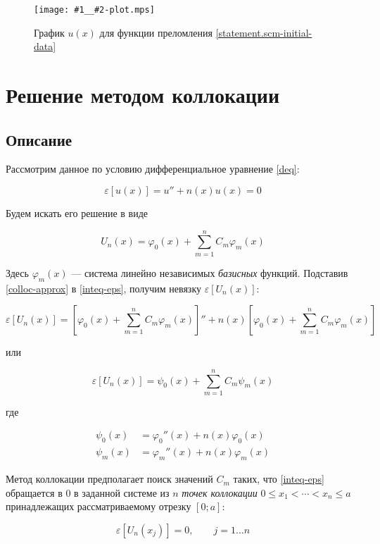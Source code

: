 \documentclass{article}
\newcommand{\includeplot}[2]{\begin{figure}[hb]
    \centering
    \texttt{[image: \#1\_\_\#2-plot.mps]}
    \caption{График $u(x)$ для функции преломления \eqref{#2-initial-data}}
\end{figure}}
\renewcommand{\epsilon}{\varepsilon}
\renewcommand{\phi}{\varphi}
\numberwithin{equation}{section}
\begin{document}


\includeplot{iterative}{statement.scm}

\clearpage
\section{Решение методом коллокации}
\subsection{Описание}
Рассмотрим данное по условию дифференциальное уравнение \eqref{deq}:

\begin{equation}\label{inteq-eps}
  \epsilon [u(x)] = u'' + n(x) u(x) = 0
\end{equation}

Будем искать его решение в виде

\begin{equation}\label{colloc-approx}
  U_n(x) = \phi_0(x) + \sum_{m=1}^n{C_m \phi_m(x)}
\end{equation}

Здесь $\phi_m(x)$ — система линейно независимых \emph{базисных}
функций. Подставив \eqref{colloc-approx} в \eqref{inteq-eps}, получим
невязку $\epsilon [U_n(x)]$:

\[
\epsilon[U_n(x)]=\left [\phi_0(x)+\sum_{m=1}^n{C_m \phi_m(x)} \right
]''+
n(x){\left [\phi_0(x)+\sum_{m=1}^n{C_m \phi_m(x)} \right ]}
\]

или

\begin{equation}\label{colloc-eps}
\epsilon[U_n(x)]=\psi_0(x)+\sum_{m=1}^n{C_m \psi_m(x)}
\end{equation}

где

\begin{align*}
\psi_0(x)& =\phi_0''(x) + n(x) \phi_0(x) \\
\psi_m(x)& =\phi_m''(x) + n(x) \phi_m(x)
\end{align*}

Метод коллокации предполагает поиск значений $C_m$ таких, что
\eqref{inteq-eps} обращается в 0 в заданной системе из $n$ \emph{точек
  коллокации} $0 \leq x_1 < \dotsb < x_n \leq a$ принадлежащих
рассматриваемому отрезку $[0;a]$:

\begin{equation}
  \epsilon[U_n(x_j)] = 0,\qquad j = 1 \dotso n
\end{equation}
\end{document}
